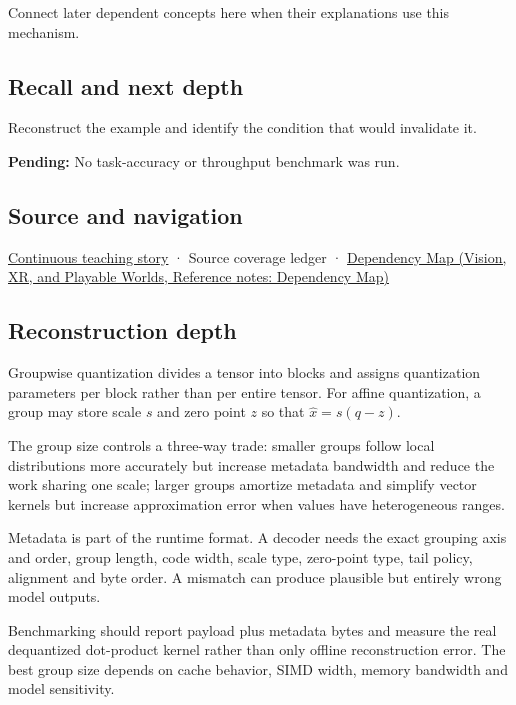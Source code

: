 \hypertarget{appendix-638204c40e8b-used-by}{}

Connect later dependent concepts here when their explanations use this mechanism.

\subsection{Recall and next depth}\label{appendix-638204c40e8b-recall-and-next-depth}

\hypertarget{appendix-638204c40e8b-recall-and-next-depth}{}

Reconstruct the example and identify the condition that would invalidate it.

\textbf{Pending:} No task-accuracy or throughput benchmark was run.

\subsection{Source and navigation}\label{appendix-638204c40e8b-source-and-navigation}

\hypertarget{appendix-638204c40e8b-source-and-navigation}{}

\hyperref[01-foundations-i-ch001-choosing-what-information-to-keep]{Continuous teaching story} · {Source coverage ledger} · \href{../07-Vision-XR-and-Playable-Worlds/main.pdf\#nameddest=appendix-4ad47bdd269a}{Dependency Map (Vision, XR, and Playable Worlds, Reference notes: Dependency Map)}

\subsection{Reconstruction depth}\label{appendix-638204c40e8b-reconstruction-depth}

\hypertarget{appendix-638204c40e8b-reconstruction-depth}{}

Groupwise quantization divides a tensor into blocks and assigns quantization parameters per block rather than per entire tensor. For affine quantization, a group may store scale \(s\) and zero point \(z\) so that \(\hat x=s(q-z)\).

The group size controls a three-way trade: smaller groups follow local distributions more accurately but increase metadata bandwidth and reduce the work sharing one scale; larger groups amortize metadata and simplify vector kernels but increase approximation error when values have heterogeneous ranges.

Metadata is part of the runtime format. A decoder needs the exact grouping axis and order, group length, code width, scale type, zero-point type, tail policy, alignment and byte order. A mismatch can produce plausible but entirely wrong model outputs.

Benchmarking should report payload plus metadata bytes and measure the real dequantized dot-product kernel rather than only offline reconstruction error. The best group size depends on cache behavior, SIMD width, memory bandwidth and model sensitivity.
